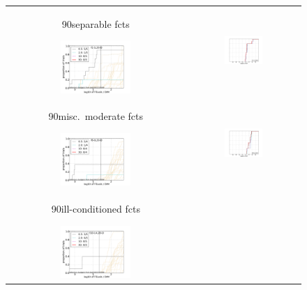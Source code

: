 \documentclass{article}
\newcommand{\rot}[2][2.5]{
  \hspace*{-3.5\baselineskip}%
  \begin{rotate}{90}\hspace{#1em}#2
  \end{rotate}}
\begin{document}
\begin{figure}[htbp!]
\centering
\begin{tabular}{@{}c@{}c@{}}
\rot[2.5]{separable fcts}
\includegraphics[width=0.41\textwidth,trim=0 7.5mm 16mm 11mm, clip]{pprldistr_20D_separ} &
\includegraphics[width=0.3579\textwidth,trim=24mm 7.5mm 16mm 11mm, clip]{ppfvdistr_20D_separ}
\\[-1ex]
\rot[1.3]{misc.\ moderate fcts}
\includegraphics[width=0.41\textwidth,trim=0 7.5mm 16mm 11mm, clip]{pprldistr_20D_lcond} &
\includegraphics[width=0.3579\textwidth,trim=24mm 7.5mm 16mm 11mm, clip]{ppfvdistr_20D_lcond}
\\[-1ex]
\rot[1.1]{ill-conditioned fcts}
\includegraphics[width=0.41\textwidth,trim=0 7.5mm 16mm 11mm, clip]{pprldistr_20D_hcond} &

\end{tabular}
\end{figure}
\end{document}
